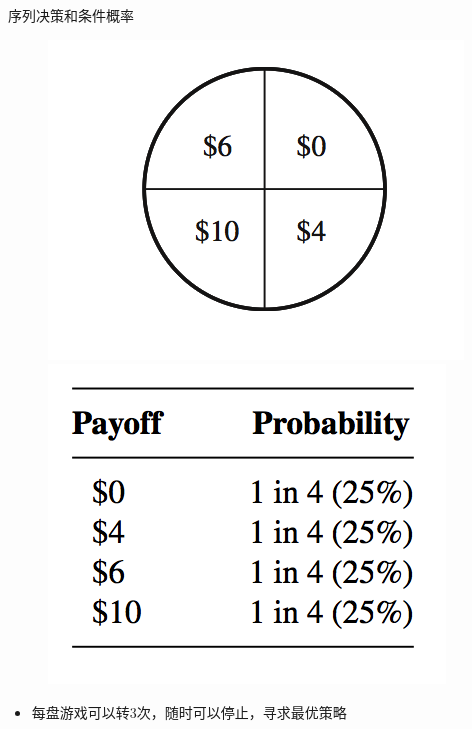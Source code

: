 \documentclass[UTF8]{ctexbeamer}
\begin{document}
\begin{frame}{序列决策和条件概率}
  
  \begin{figure}
    \includegraphics[height=0.4\textheight{}]{lunpan.png}
    \includegraphics[height=0.4\textheight{}]{payoff.png}
  \end{figure}

  \begin{itemize}
  \item 每盘游戏可以转3次，随时可以停止，寻求最优策略
  \end{itemize}

\end{frame}
\end{document}
